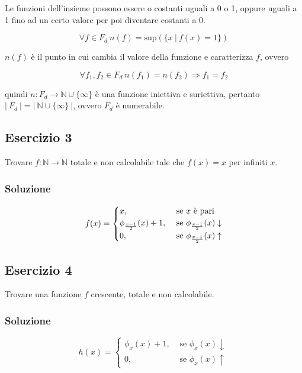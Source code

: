Le funzioni dell'insieme possono essere o costanti uguali a 0 o 1, oppure uguali a 1 fino ad un certo valore per poi diventare costanti a 0.

$$ \forall f \in F_d \: n(f)  = \text{sup}(\{x \: | \: f(x) = 1\})$$

$ n(f) $ è il punto in cui cambia il valore della funzione e caratterizza $ f $, ovvero

$$
\forall f_1, f_2 \in F_d \: n(f_1) = n(f_2) \Rightarrow f_1 = f_2
$$

quindi $ n : F_d \rightarrow \mathbb{N} \cup \{\infty\} $ è una funzione iniettiva e suriettiva, pertanto $ |\: F_d \:| = |\: \mathbb{N} \cup \{ \infty \} \:| $, ovvero $ F_d $ è numerabile.


\subsection{Esercizio 3}

Trovare $ f : \mathbb{N} \rightarrow \mathbb{N} $ totale e non calcolabile tale che $ f(x)  =x $ per infiniti $ x $.

\subsubsection{Soluzione}

$$
f(x) = \begin{cases}
x, &\text{ se $ x $ è pari} \\
\phi_{\frac{x-1}{2}}(x) +1, &\text{ se } \phi_{\frac{x-1}{2}}(x) \downarrow \\
0, &\text{ se } \phi_{\frac{x-1}{2}}(x) \uparrow 
\end{cases}
$$

\subsection{Esercizio 4}

Trovare una funzione $ f $ crescente, totale e non calcolabile.

\subsubsection{Soluzione}

$$
h(x) = \begin{cases}
\phi_x(x)+1, &\text{ se }\phi_x(x)\downarrow \\
0, &\text{ se } \phi_x(x) \uparrow
\end{cases}
$$

